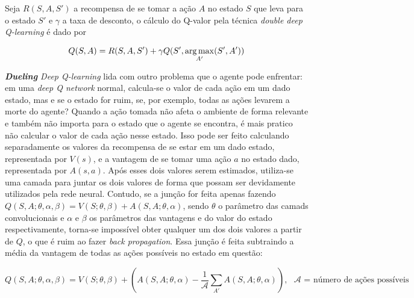 Seja $R(S,A,S')$ a recompensa de se tomar a ação $A$ no estado $S$ que leva para o estado $S'$ e $\gamma$ a taxa de desconto, o cálculo do Q-valor pela técnica \textit{double deep Q-learning} é dado por

\begin{equation} \label{eq:doubledqn}
Q(S,A) = R(S,A,S') + \gamma Q(S', \operatorname*{arg\,max}_{A'}(S',A'))
\end{equation}

\textit{\textbf{Dueling} Deep Q-learning} lida com outro problema que o agente pode enfrentar:
em uma \textit{deep Q network} normal, calcula-se o valor de cada ação em um dado estado, mas e se o estado for ruim, se, por exemplo, todas as ações levarem a morte do agente?
Quando a ação tomada não afeta o ambiente de forma relevante e também não importa para o estado que o agente se encontra, é mais pratico não calcular o valor de cada ação nesse estado.
Isso pode ser feito calculando separadamente os valores da recompensa de se estar em um dado estado, representada por $V(s)$, e a vantagem de se tomar uma ação $a$ no estado dado, representada por $A(s,a)$.
Após esses dois valores serem estimados, utiliza-se uma camada para juntar os dois valores de forma que possam ser devidamente utilizados pela rede neural.
Contudo, se a junção for feita apenas fazendo $Q(S, A;\theta, \alpha, \beta) = V(S; \theta, \beta) + A(S, A; \theta, \alpha)$, sendo $\theta$ o parâmetro das camads convolucionais e $\alpha$ e $\beta$ os parâmetros das vantagens e do valor do estado respectivamente, torna-se impossível obter qualquer um dos dois valores a partir de $Q$, o que é ruim ao fazer \textit{back propagation}.
Essa junção é feita subtraindo a média da vantagem de todas as ações possíveis no estado em questão:

\begin{equation} \label{eq:duelingdqn}
Q(S,A;\theta,\alpha,\beta) = V(S;\theta,\beta) + (A(S,A;\theta,\alpha) - \frac{1}{\mathcal{A}}\sum_{A'}A(S,A;\theta,\alpha)), \text{ $\mathcal{A}$ = número de ações possíveis}
\end{equation}

